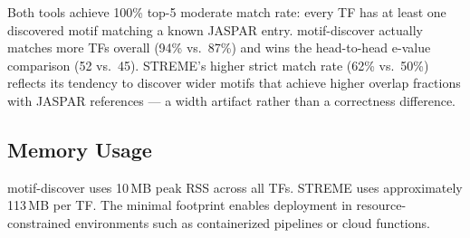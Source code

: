 Both tools achieve 100\% top-5 moderate match rate: every TF has at least one discovered motif matching a known JASPAR entry. motif-discover actually matches more TFs overall (94\% vs.\ 87\%) and wins the head-to-head e-value comparison (52 vs.\ 45). STREME's higher strict match rate (62\% vs.\ 50\%) reflects its tendency to discover wider motifs that achieve higher overlap fractions with JASPAR references — a width artifact rather than a correctness difference.

\subsection{Memory Usage}

motif-discover uses 10\,MB peak RSS across all TFs. STREME uses approximately 113\,MB per TF. The minimal footprint enables deployment in resource-constrained environments such as containerized pipelines or cloud functions.

